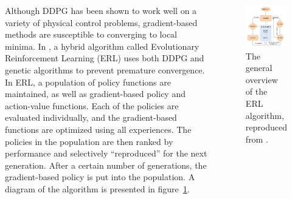 \documentclass[20pt,margin=1in,innermargin=-6in,blockverticalspace=-0.25in]{tikzposter}
\begin{document}
\begin{columns}
{    Although DDPG has been shown to work well on a variety of physical control problems, gradient-based methods are susceptible to converging to local minima. In \cite{khadka2018evolutionguided}, a hybrid algorithm called Evolutionary Reinforcement Learning (ERL) uses both DDPG and genetic algorithms to prevent premature convergence. In ERL, a population of policy functions are maintained, as well as gradient-based policy and action-value functions. Each of the policies are evaluated individually, and the gradient-based functions are optimized using all experiences. The policies in the population are then ranked by performance and selectively ``reproduced'' for the next generation. After a certain number of generations, the gradient-based policy is put into the population. A diagram of the algorithm is presented in figure~\ref{fig:ERL}.
    \begin{minipage}{\linewidth}
    \begin{figure}[H]
        \centering
        \includegraphics[width=0.7\linewidth]{graphics/ERL.png}
        \caption{The general overview of the ERL algorithm, reproduced from \cite{khadka2018evolutionguided}.}
        \label{fig:ERL}
    \end{figure}
    \end{minipage}
    } %
    
    

\end{columns}
\end{document}

